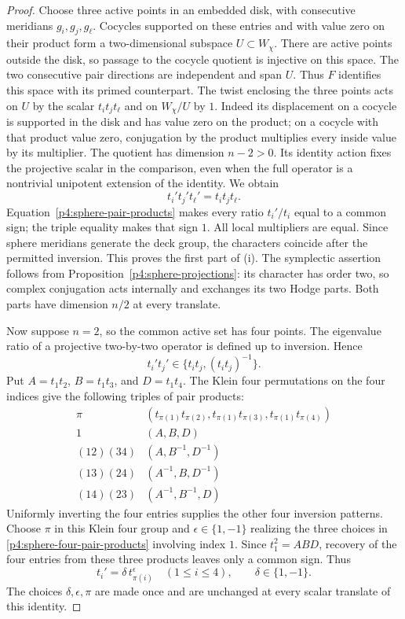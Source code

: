 \documentclass[11pt]{article}
\theoremstyle{plain}
\theoremstyle{definition}
\theoremstyle{remark}
\numberwithin{equation}{section}
\begin{document}
\begin{proof}
Choose three active points in an embedded disk, with consecutive
meridians $g_i,g_j,g_\ell$.  Cocycles supported on these entries
and with value zero on their product form a two-dimensional
subspace $U\subset W_\chi$.  There are active points outside
the disk, so passage to the cocycle quotient is injective on
this space.  The two consecutive pair directions are independent
and span $U$.  Thus $F$ identifies this space with its primed
counterpart.  The twist enclosing the three points acts on
$U$ by the scalar $t_it_jt_\ell$ and on $W_\chi/U$ by $1$.
Indeed its displacement on a cocycle is supported in the disk
and has value zero on the product; on a cocycle with that
product value zero, conjugation by the product multiplies
every inside value by its multiplier.  The quotient has
dimension $n-2>0$.  Its identity action fixes the projective scalar
in the comparison, even when the full operator is a nontrivial
unipotent extension of the identity.  We obtain
\[
 t_i't_j't_\ell'=t_it_jt_\ell.
\]
Equation~\eqref{p4:sphere-pair-products} makes every ratio
$t_i'/t_i$ equal to a common sign; the triple equality makes
that sign $1$.  All local multipliers are equal.  Since sphere
meridians generate the deck group, the characters coincide
after the permitted inversion.  This proves the first part
of (i).  The symplectic assertion follows from
Proposition~\ref{p4:sphere-projections}: its character has
order two, so complex conjugation acts internally and exchanges
its two Hodge parts.  Both parts have dimension $n/2$ at every
translate.

Now suppose $n=2$, so the common active set has four points.
The eigenvalue ratio of a projective two-by-two operator is
defined up to inversion.  Hence
\begin{equation}\label{p4:sphere-four-pair-products}
 t_i't_j'\in\{t_it_j,(t_it_j)^{-1}\}.
\end{equation}
Put $A=t_1t_2$, $B=t_1t_3$, and $D=t_1t_4$.
The Klein four permutations on the four indices give the
following triples of pair products:
\[
\begin{array}{c|c}
 \pi&(t_{\pi(1)}t_{\pi(2)},
       t_{\pi(1)}t_{\pi(3)},t_{\pi(1)}t_{\pi(4)})\\ \hline
 1&(A,B,D)\\
 (12)(34)&(A,B^{-1},D^{-1})\\
 (13)(24)&(A^{-1},B,D^{-1})\\
 (14)(23)&(A^{-1},B^{-1},D)
\end{array}
\]
Uniformly inverting the four entries supplies the other four
inversion patterns.  Choose $\pi$ in this Klein four group and
$\epsilon\in\{1,-1\}$ realizing the three choices in
\eqref{p4:sphere-four-pair-products} involving index $1$.
Since $t_1^2=ABD$, recovery of the four entries from these
three products leaves only a common sign.  Thus
\begin{equation}\label{p4:sphere-four-tuple}
 t_i'=\delta\,t_{\pi(i)}^\epsilon\quad(1\le i\le4),
 \qquad \delta\in\{1,-1\}.
\end{equation}
The choices $\delta,\epsilon,\pi$ are made once and are
unchanged at every scalar translate of this identity.


\end{proof}
\end{document}
